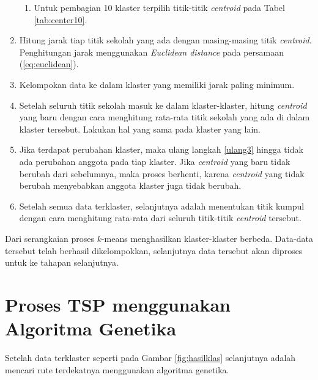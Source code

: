 \begin{enumerate}
\begin{enumerate}


	\item Untuk pembagian 10 klaster terpilih titik-titik \textit{centroid} pada Tabel \ref{tab:center10}.
	

		
	\end{enumerate}

	\item \label{ulang3} Hitung jarak tiap titik sekolah yang ada dengan masing-masing titik \textit{centroid}. Penghitungan jarak menggunakan \textit{Euclidean distance} pada persamaan (\ref{eq:euclidean}).
	
	\item Kelompokan data ke dalam klaster yang memiliki jarak paling minimum.
	\item Setelah seluruh titik sekolah masuk ke dalam klaster-klaster, hitung \textit{centroid} yang baru dengan cara menghitung rata-rata titik sekolah yang ada di dalam klaster tersebut. Lakukan hal yang sama pada klaster yang lain.
	\item Jika terdapat perubahan klaster, maka ulang langkah \ref{ulang3} hingga tidak ada perubahan anggota pada tiap klaster. Jika \textit{centroid} yang baru tidak berubah dari sebelumnya, maka proses berhenti, karena \textit{centroid} yang tidak berubah menyebabkan anggota klaster juga tidak berubah.
	
	\item Setelah semua data terklaster, selanjutnya adalah menentukan titik kumpul dengan cara menghitung rata-rata dari seluruh titik-titik \textit{centroid} tersebut.
\end{enumerate}

Dari serangkaian proses $k$-means menghasilkan klaster-klaster berbeda. Data-data tersebut telah berhasil dikelompokkan, selanjutnya data tersebut akan diproses untuk ke tahapan selanjutnya.

\section{Proses TSP menggunakan Algoritma Genetika}

Setelah data terklaster seperti pada Gambar \ref{fig:hasilklas} selanjutnya adalah mencari rute terdekatnya menggunakan algoritma genetika.

